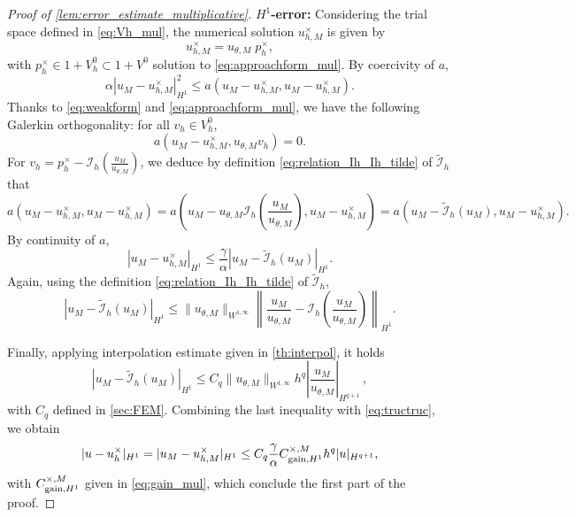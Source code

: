 \begin{proof}[Proof of \cref{lem:error_estimate_multiplicative}]
	\textbf{$H^1$-error:}
	Considering the trial space defined in \eqref{eq:Vh_mul}, the numerical solution $u_{h,M}^\times$ is given by
	\[
		u_{h,M}^\times=u_{\theta,M} \; p_h^\times,
	\]
	with $p_h^\times\in 1+ V_h^0\subset 1 + V^0$  solution to \eqref{eq:approachform_mul}.
By coercivity of $a$,
		\[
		\alpha| u_M-u_{h,M}^\times|_{H^1}^2
		\leq a(u_M-u_{h,M}^\times,u_M-u_{h,M}^\times) .
	\]
	Thanks to \eqref{eq:weakform} and \eqref{eq:approachform_mul}, we have the following Galerkin orthogonality: for all $v_h\in V_h^0$,
\begin{equation}\label{eq:orthGalmult}
a(	u_M-u_{h,M}^\times, u_{\theta,M}v_h)=0.
\end{equation}
	For $v_h=p_h^{\times} -\mathcal{I}_h\left(\frac{u_M}{u_{\theta,M}}\right)$, we deduce by definition \eqref{eq:relation_Ih_Ih_tilde} of $\tilde{\mathcal{I}}_h$ that
			$$%
	a(u_M-u_{h,M}^\times,u_M-u_{h,M}^\times)
		=a\left(u_M-u_{\theta,M}\mathcal{I}_h\left(\frac{u_M}{u_{\theta,M}}\right),u_M-u_{h,M}^\times\right)
				=a(u_M-\tilde{\mathcal{I}}_h(u_M),u_M-u_{h,M}^\times) .
$$
By continuity of $a$,
\begin{equation}\label{eq:tructruc}
		| u_M-u_{h,M}^\times|_{H^1} \leq \frac{\gamma}{\alpha}| u_M-\tilde{\mathcal{I}}_h(u_M)|_{H^1} .
	\end{equation}
	Again, using the definition \eqref{eq:relation_Ih_Ih_tilde} of $\tilde{\mathcal{I}}_h$,
	\[
		|u_M-\tilde{\mathcal{I}}_h(u_M)|_{H^{1}} \leq
		\|u_{\theta,M}\|_{W^{1,\infty}} \left\|\frac{u_M}{u_{\theta,M}}-\mathcal{I}_h\left(\frac{u_M}{u_{\theta,M}}\right)\right\|_{H^{1}}.
	\]


	Finally, applying interpolation estimate given in \cref{th:interpol}, it holds
	\begin{equation}\label{eq:interpol tilde Ih}
		|u_M-\tilde{\mathcal{I}}_h(u_M)|_{H^1} \leq C_q
		\|u_{\theta,M}\|_{W^{1,\infty}} h^q \left|\frac{u_M}{u_{\theta,M}}\right|_{H^{q+1}} \,,
	\end{equation}
	with $C_q$ defined in \cref{sec:FEM}.
	Combining the last inequality with \eqref{eq:tructruc}, we obtain
	\begin{equation}\label{eq:H1 mult}
		| u-u_h^\times|_{H^1} = | u_M-u_{h,M}^\times|_{H^1} \leq C_q \dfrac{\gamma}{\alpha} C_{\text{\rm gain},H^1}^{\times,M} h^{q}| u |_{H^{q+1}},
	\end{equation}
	with $C_{\text{\rm gain},H^1}^{\times,M}$ given in \eqref{eq:gain_mul}, which conclude the first part of the proof.


\end{proof}
